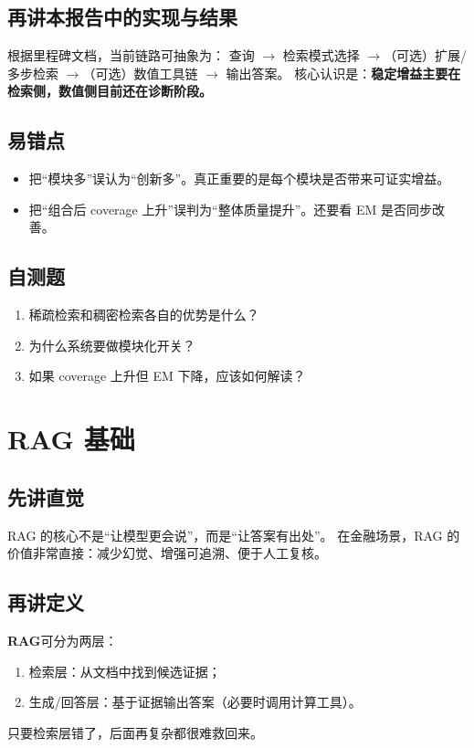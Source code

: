 \documentclass[UTF8,a4paper,12pt]{ctexart}
\begin{document}
\subsection{再讲本报告中的实现与结果}
根据里程碑文档，当前链路可抽象为：
查询 $\rightarrow$ 检索模式选择 $\rightarrow$（可选）扩展/多步检索 $\rightarrow$（可选）数值工具链 $\rightarrow$ 输出答案。  
核心认识是：\textbf{稳定增益主要在检索侧，数值侧目前还在诊断阶段。}

\subsection{易错点}
\begin{itemize}
  \item 把“模块多”误认为“创新多”。真正重要的是每个模块是否带来可证实增益。
  \item 把“组合后 coverage 上升”误判为“整体质量提升”。还要看 EM 是否同步改善。
\end{itemize}

\subsection{自测题}
\begin{enumerate}
  \item 稀疏检索和稠密检索各自的优势是什么？
  \item 为什么系统要做模块化开关？
  \item 如果 coverage 上升但 EM 下降，应该如何解读？
\end{enumerate}

\section{RAG 基础}
\subsection{先讲直觉}
RAG 的核心不是“让模型更会说”，而是“让答案有出处”。
在金融场景，RAG 的价值非常直接：减少幻觉、增强可追溯、便于人工复核。

\subsection{再讲定义}
\textbf{RAG}可分为两层：
\begin{enumerate}
  \item 检索层：从文档中找到候选证据；
  \item 生成/回答层：基于证据输出答案（必要时调用计算工具）。
\end{enumerate}
只要检索层错了，后面再复杂都很难救回来。
\end{document}
